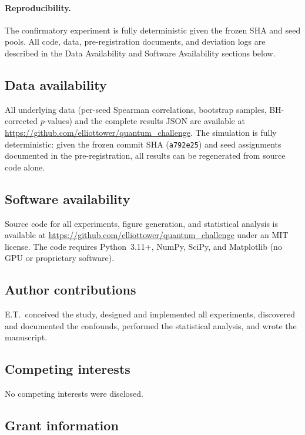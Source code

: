 \documentclass[11pt]{article}
\begin{document}
\paragraph{Reproducibility.}
The confirmatory experiment is fully deterministic given the frozen
SHA and seed pools.  All code, data, pre-registration documents,
and deviation logs are described in the Data Availability and
Software Availability sections below.

\subsection*{Data availability}

All underlying data (per-seed Spearman correlations, bootstrap
samples, BH-corrected $p$-values) and the complete results JSON
are available at \url{https://github.com/elliottower/quantum_challenge}.  The
simulation is fully deterministic: given the frozen commit SHA
(\texttt{a792e25}) and seed assignments documented in the
pre-registration, all results can be regenerated from source code
alone.

\subsection*{Software availability}

Source code for all experiments, figure generation, and statistical
analysis is available at \url{https://github.com/elliottower/quantum_challenge}
under an MIT license.  The code requires Python~3.11+, NumPy,
SciPy, and Matplotlib (no GPU or proprietary software).

\subsection*{Author contributions}

E.T.\ conceived the study, designed and implemented all experiments,
discovered and documented the confounds, performed the statistical
analysis, and wrote the manuscript.

\subsection*{Competing interests}

No competing interests were disclosed.

\subsection*{Grant information}
\end{document}
